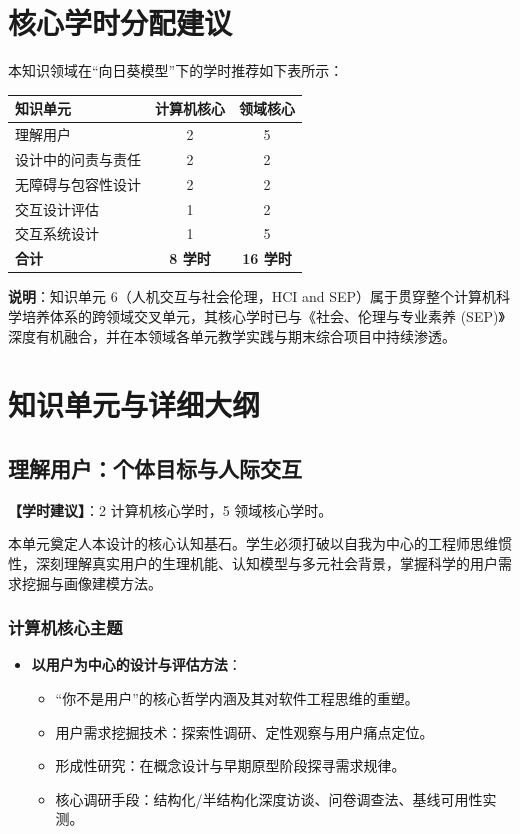 \section{核心学时分配建议}

本知识领域在“向日葵模型”下的学时推荐如下表所示：

\begin{table}[H]
\centering
\setlength{\tabcolsep}{3.5pt}\fontsize{8pt}{9.6pt}\selectfont\begin{tabularx}{\columnwidth}{Y c c}
\toprule
\textbf{知识单元} & \textbf{计算机核心} & \textbf{领域核心} \\
\midrule
理解用户 & 2 & 5 \\
设计中的问责与责任 & 2 & 2 \\
无障碍与包容性设计 & 2 & 2 \\
交互设计评估 & 1 & 2 \\
交互系统设计 & 1 & 5 \\
\midrule
\textbf{合计} & \textbf{8 学时} & \textbf{16 学时} \\
\bottomrule
\end{tabularx}
\end{table}

\noindent\textbf{说明}：知识单元 6（人机交互与社会伦理，HCI and SEP）属于贯穿整个计算机科学培养体系的跨领域交叉单元，其核心学时已与《社会、伦理与专业素养 (SEP)》深度有机融合，并在本领域各单元教学实践与期末综合项目中持续渗透。

\section{知识单元与详细大纲}

\subsection{理解用户：个体目标与人际交互}
\textbf{【学时建议】}：2 计算机核心学时，5 领域核心学时。

本单元奠定人本设计的核心认知基石。学生必须打破以自我为中心的工程师思维惯性，深刻理解真实用户的生理机能、认知模型与多元社会背景，掌握科学的用户需求挖掘与画像建模方法。

\subsubsection{计算机核心主题}
\begin{itemize}
    \item \textbf{以用户为中心的设计与评估方法}：
    \begin{itemize}
        \item “你不是用户”的核心哲学内涵及其对软件工程思维的重塑。
        \item 用户需求挖掘技术：探索性调研、定性观察与用户痛点定位。
        \item 形成性研究：在概念设计与早期原型阶段探寻需求规律。
        \item 核心调研手段：结构化/半结构化深度访谈、问卷调查法、基线可用性实测。
    \end{itemize}
\end{itemize}

